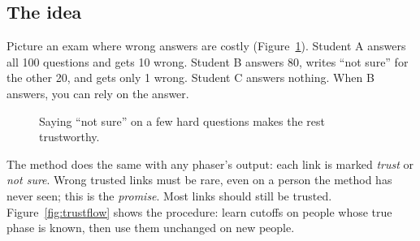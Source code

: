 \documentclass[11pt]{article}
\begin{document}
\subsection{The idea}

Picture an exam where wrong answers are costly (Figure~\ref{fig:exam}).
Student A answers all 100 questions and gets 10 wrong. Student B answers 80,
writes \enquote{not sure} for the other 20, and gets only 1 wrong. Student C
answers nothing. When B answers, you can rely on the answer.

\begin{figure}[h]
\centering
{}
\caption{Saying \enquote{not sure} on a few hard questions makes the rest
trustworthy.}
\label{fig:exam}
\end{figure}

The method does the same with any phaser's output: each link is marked
\emph{trust} or \emph{not sure}. Wrong trusted links must be rare, even on a
person the method has never seen; this is the \emph{promise}. Most links
should still be trusted. Figure~\ref{fig:trustflow} shows the procedure:
learn cutoffs on people whose true phase is known, then use them unchanged
on new people.
\end{document}
